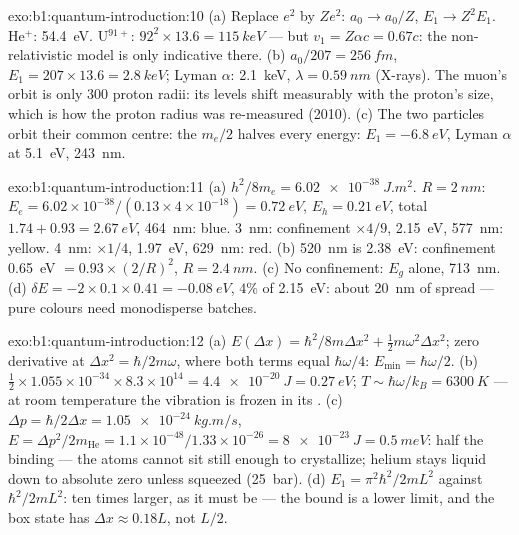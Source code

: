 \begin{solution}{exo:b1:quantum-introduction:10}
(a) Replace $e^2$ by $Ze^2$: $a_0 \to a_0/Z$, $E_1 \to Z^2E_1$. He$^+$:
\qty{54.4}{eV}. U$^{91+}$: $92^2 \times 13.6 = \qty{115}{keV}$ --- but $v_1 = Z\alpha c
= 0.67c$: the non-relativistic model is only indicative there. (b) $a_0/207
= \qty{256}{fm}$, $E_1 = 207 \times 13.6 = \qty{2.8}{keV}$; Lyman $\alpha$:
\qty{2.1}{keV}, $\lambda = \qty{0.59}{nm}$ (X-rays). The muon's orbit is only
$300$ proton radii: its levels shift measurably with the proton's size,
which is how the proton radius was re-measured (2010). (c) The two
particles orbit their common centre: the  $m_e/2$ halves
every energy: $E_1 = \qty{-6.8}{eV}$, Lyman $\alpha$ at \qty{5.1}{eV}, \qty{243}{nm}.
\end{solution}

\begin{solution}{exo:b1:quantum-introduction:11}
(a) $h^2/8m_e = \qty{6.02e-38}{J.m^2}$. $R = \qty{2}{nm}$: $E_e = 6.02 \times 10^{-38}/
(0.13 \times 4 \times 10^{-18}) = \qty{0.72}{eV}$, $E_h = \qty{0.21}{eV}$, total $1.74 +
0.93 = \qty{2.67}{eV}$, \qty{464}{nm}: blue. \qty{3}{nm}: confinement $\times4/9$,
\qty{2.15}{eV}, \qty{577}{nm}: yellow. \qty{4}{nm}: $\times1/4$, \qty{1.97}{eV},
\qty{629}{nm}: red. (b) \qty{520}{nm} is \qty{2.38}{eV}: confinement \qty{0.65}{eV}
$= 0.93 \times (2/R)^2$, $R = \qty{2.4}{nm}$. (c) No confinement: $E_g$ alone,
\qty{713}{nm}. (d) $\delta E = -2 \times 0.1 \times 0.41 = \qty{-0.08}{eV}$, $4\%$ of
\qty{2.15}{eV}: about \qty{20}{nm} of spread --- pure colours need
monodisperse batches.
\end{solution}

\begin{solution}{exo:b1:quantum-introduction:12}
(a) $E(\Delta x) = \hbar^2/8m\Delta x^2 + \tfrac12m\omega^2\Delta x^2$; zero derivative at
$\Delta x^2 = \hbar/2m\omega$, where both terms equal $\hbar\omega/4$: $E_{\min} =
\hbar\omega/2$. (b) $\tfrac12 \times 1.055 \times 10^{-34} \times 8.3 \times 10^{14} = \qty{4.4e-20}{J}
= \qty{0.27}{eV}$; $T \sim \hbar\omega/k_B = \qty{6300}{K}$ --- at room temperature
the vibration is frozen in its . (c) $\Delta p = \hbar/2\Delta x =
\qty{1.05e-24}{kg.m/s}$, $E = \Delta p^2/2m_{\mathrm{He}} = 1.1 \times 10^{-48}/1.33 \times
10^{-26} = \qty{8e-23}{J} = \qty{0.5}{meV}$: half the binding --- the atoms cannot
sit still enough to crystallize; helium stays liquid down to absolute
zero unless squeezed (\qty{25}{bar}). (d) $E_1 = \pi^2\hbar^2/2mL^2$ against
$\hbar^2/2mL^2$: ten times larger, as it must be --- the bound is a lower
limit, and the box state has $\Delta x \approx 0.18L$, not $L/2$.
\end{solution}

